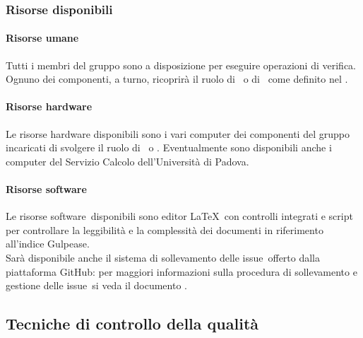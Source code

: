 \documentclass[../PianoDiQualifica.tex]{subfiles}
\begin{document}
		    \subsubsection{Risorse disponibili}
			    \paragraph{Risorse umane}
			    Tutti i membri del gruppo sono a disposizione per eseguire operazioni di verifica. Ognuno dei componenti, a turno, ricoprirà il ruolo di \responsabilediprogetto\ o di \verificatore\ come definito nel \pianodiprogettov.
			    \paragraph{Risorse hardware}
			    Le risorse hardware disponibili sono i vari computer dei componenti del gruppo incaricati di svolgere il ruolo di \responsabilediprogetto\ o \verificatore. Eventualmente sono disponibili anche i computer del Servizio Calcolo dell'Università di Padova.
				\paragraph{Risorse software}
				Le risorse software\g\ disponibili sono editor \LaTeX\g\ con controlli integrati e script per controllare la leggibilità e la complessità dei documenti in riferimento all'indice Gulpease\g.\\
				Sarà disponibile anche il sistema di sollevamento delle issue\g\ offerto dalla piattaforma GitHub\g: per maggiori informazioni sulla procedura di sollevamento e gestione delle issue\g\ 
si veda il documento \normediprogettov.
		\subsection{Tecniche di controllo della qualità}
\end{document}
